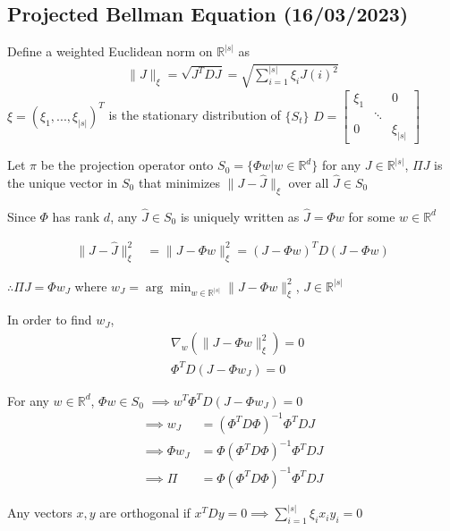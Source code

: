 \documentclass[11pt]{article}
\begin{document}
\subsection{Projected Bellman Equation (16/03/2023)}
\label{sec:orga71d6e7}

Define a weighted Euclidean norm on \(\mathbb{R}^{|s|}\) as
\begin{align*}
\lVert J \rVert_{\xi} = \sqrt{J^TDJ} = \sqrt{\sum_{i=1}^{|s|} \xi_i J(i)^2}
\end{align*}
\(\xi = (\xi_1, ..., \xi_{|s|})^T\) is the stationary distribution of \(\{S_t\}\)
\(D = \begin{bmatrix} \xi_1 & & 0 \\ & \ddots & \\ 0 & & \xi_{|s|} \end{bmatrix}\)

Let \(\pi\) be the projection operator onto \(S_0 = \{ \Phi w | w \in \mathbb{R}^d\}\)
for any \(J \in \mathbb{R}^{|s|}\), \(\Pi J\) is the unique vector in \(S_0\) that minimizes \(\lVert J - \hat{J} \rVert_{\xi}\) over all \(\hat{J} \in S_0\)

Since \(\Phi\) has rank \(d\), any \(\hat{J} \in S_0\) is uniquely written as \(\hat{J} = \Phi w\) for some \(w \in \mathbb{R}^d\)

\begin{align*}
\lVert J - \hat{J} \rVert_{\xi}^2 &= \lVert J - \Phi w \rVert_{\xi}^2 = (J - \Phi w)^TD(J - \Phi w)
\end{align*}


\(\therefore \Pi J = \Phi w_J\) where \(w_J = \arg\min_{w \in \mathbb{R}^{|s|}} \lVert J - \Phi w \rVert_{\xi}^2\), \(J \in \mathbb{R}^{|s|}\)

In order to find \(w_J\),
\begin{align*}
&\nabla_w (\lVert J - \Phi w \rVert_{\xi}^2) = 0 \\
&\Phi^TD(J - \Phi w_J) = 0
\end{align*}

For any \(w \in \mathbb{R}^d\), \(\Phi w \in S_0\) \(\implies w^T\Phi^T D (J - \Phi w_J) = 0\)
\begin{align*}
\implies w_J &= (\Phi^TD\Phi)^{-1} \Phi^TDJ \\
\implies \Phi w_J &= \Phi(\Phi^TD\Phi)^{-1} \Phi^TD J \\
\implies \Pi &= \Phi(\Phi^TD\Phi)^{-1}\Phi^TDJ
\end{align*} 

Any vectors \(x, y\) are orthogonal if \(x^TDy = 0 \implies \sum_{i=1}^{|s|} \xi_ix_iy_i = 0\)
\end{document}
